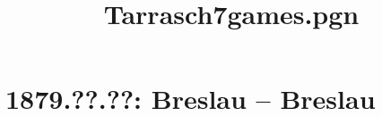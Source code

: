 \documentclass[11pt]{article}
\title{Tarrasch7games.pgn}
\begin{document}
\maketitle


\tableofcontents
\pagebreak[4]

\printindex
\pagebreak[4]

\section{1879.??.??: Breslau -- Breslau}

\pagebreak[4]


\pagebreak[4]


\pagebreak[4]


\pagebreak[4]


\pagebreak[4]


\pagebreak[4]


\pagebreak[4]
\end{document}
